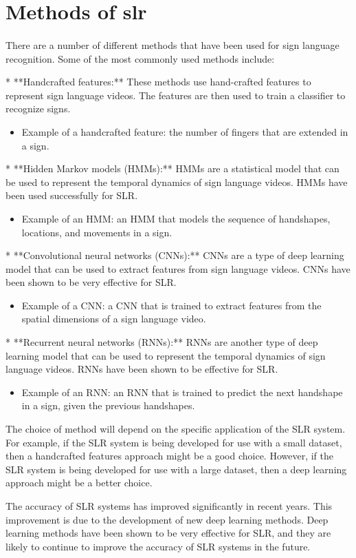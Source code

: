 \section{Methods of \ac{slr}}
\paragraph{}
There are a number of different methods that have been used for sign language recognition. Some of the most commonly used methods include:

* **Handcrafted features:** These methods use hand-crafted features to represent sign language videos. The features are then used to train a classifier to recognize signs.

\begin{itemize}
	\item Example of a handcrafted feature: the number of fingers that are extended in a sign.
\end{itemize}

* **Hidden Markov models (HMMs):** HMMs are a statistical model that can be used to represent the temporal dynamics of sign language videos. HMMs have been used successfully for SLR.

\begin{itemize}
	\item Example of an HMM: an HMM that models the sequence of handshapes, locations, and movements in a sign.
\end{itemize}

* **Convolutional neural networks (CNNs):** CNNs are a type of deep learning model that can be used to extract features from sign language videos. CNNs have been shown to be very effective for SLR.

\begin{itemize}
	\item Example of a CNN: a CNN that is trained to extract features from the spatial dimensions of a sign language video.
\end{itemize}

* **Recurrent neural networks (RNNs):** RNNs are another type of deep learning model that can be used to represent the temporal dynamics of sign language videos. RNNs have been shown to be effective for SLR.

\begin{itemize}
	\item Example of an RNN: an RNN that is trained to predict the next handshape in a sign, given the previous handshapes.
\end{itemize}

The choice of method will depend on the specific application of the SLR system. For example, if the SLR system is being developed for use with a small dataset, then a handcrafted features approach might be a good choice. However, if the SLR system is being developed for use with a large dataset, then a deep learning approach might be a better choice.

The accuracy of SLR systems has improved significantly in recent years. This improvement is due to the development of new deep learning methods. Deep learning methods have been shown to be very effective for SLR, and they are likely to continue to improve the accuracy of SLR systems in the future.
